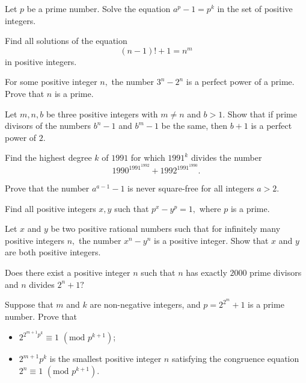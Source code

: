 \documentclass{subfile}
\begin{document}
	\begin{problem}
		Let $p$ be a prime number. Solve the equation $a^p-1 = p^k$ in the set of positive integers.
	\end{problem}

	\begin{problem}
		Find all solutions of the equation
		\[(n-1)! + 1 = n^m\]
		in positive integers.
	\end{problem}

	\begin{problem}[Bulgaria 1997]
		For some positive integer $n,$ the number $3^n-2^n$ is a perfect power of a prime. Prove that $n$ is a prime.
	\end{problem}

	\begin{problem}
		Let $m,n,b$ be three positive integers with $m \neq n$ and $b>1.$ Show that if prime divisors of the numbers $b^n-1$ and $b^m-1$ be the same, then $b+1$ is a perfect power of $2.$
	\end{problem}

	\begin{problem}
		Find the highest degree $ k$ of $ 1991$ for which $ 1991^k$ divides the number \[ 1990^{1991^{1992}} + 1992^{1991^{1990}}.\]
	\end{problem}

	\begin{problem}
		Prove that the number $a^{a-1}-1$ is never square-free for all integers $a>2$.
	\end{problem}

	\begin{problem}
		Find all positive integers $x,y$ such that $p^x - y^p=1,$ where $p$ is a prime.
	\end{problem}



	\begin{problem}
		Let $x$ and $y$ be two positive rational numbers such that for infinitely many positive integers $n,$ the number $x^n-y^n$ is a positive integer. Show that $x$ and $y$ are both positive integers.
	\end{problem}

	\begin{problem}[IMO 2000]
		Does there exist a positive integer $n$ such that $n$ has exactly $2000$ prime divisors and $n$ divides $2^n + 1?$
	\end{problem}

	\begin{problem}
		Suppose that $m$ and $k$ are non-negative integers, and $p = 2^{2^m}+1$ is a prime number. Prove that
		\begin{itemize}
			\item $2^{2^{m+1}p^k} \equiv 1$ $(\text{mod } p^{k+1})$;
			\item $2^{m+1}p^k$ is the smallest positive integer $n$ satisfying the congruence equation $2^n \equiv 1$ $(\text{mod } p^{k+1})$.
		\end{itemize}
	\end{problem}
\end{document}
